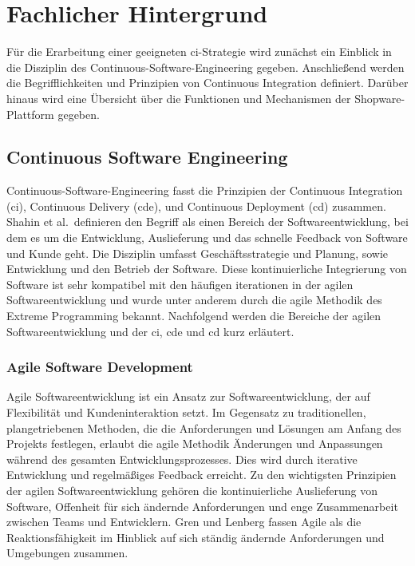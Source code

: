 
\section{Fachlicher Hintergrund} \label{sec:02-background}

Für die Erarbeitung einer geeigneten \acrshort{ci}-Strategie wird zunächst ein Einblick in die Disziplin des
Continuous-Software-Engineering gegeben.
Anschließend werden die Begrifflichkeiten und Prinzipien von Continuous Integration definiert.
Darüber hinaus wird eine Übersicht über die Funktionen und Mechanismen der Shopware-Plattform gegeben.

\subsection{Continuous Software Engineering} \label{subsec:02-background-1}

Continuous-Software-Engineering fasst die Prinzipien der Continuous Integration (\acrshort{ci}),
Continuous Delivery (\acrshort{cde}), und Continuous Deployment (\acrshort{cd}) zusammen.
Shahin et al.\ definieren den Begriff als einen Bereich der Softwareentwicklung, bei dem es um die Entwicklung,
Auslieferung und das schnelle Feedback von Software und Kunde geht.
Die Disziplin umfasst Geschäftsstrategie und Planung, sowie Entwicklung und den Betrieb der Software.
Diese kontinuierliche Integrierung von Software ist sehr kompatibel mit den häufigen iterationen in der agilen
Softwareentwicklung und wurde unter anderem durch die agile Methodik des Extreme Programming bekannt.
Nachfolgend werden die Bereiche der agilen Softwareentwicklung und der \acrshort{ci}, \acrshort{cde} und \acrshort{cd} kurz erläutert.

\subsubsection{Agile Software Development}

Agile Softwareentwicklung ist ein Ansatz zur Softwareentwicklung, der auf Flexibilität und Kundeninteraktion setzt.
Im Gegensatz zu traditionellen, plangetriebenen Methoden, die die Anforderungen und Lösungen am Anfang des Projekts
festlegen, erlaubt die agile Methodik Änderungen und Anpassungen während des gesamten Entwicklungsprozesses.
Dies wird durch iterative Entwicklung und regelmäßiges Feedback erreicht.
Zu den wichtigsten Prinzipien der agilen Softwareentwicklung gehören die kontinuierliche Auslieferung von Software,
Offenheit für sich ändernde Anforderungen und enge Zusammenarbeit zwischen Teams und Entwicklern.
Gren und Lenberg fassen Agile als die Reaktionsfähigkeit im Hinblick auf sich ständig ändernde Anforderungen
und Umgebungen zusammen.

